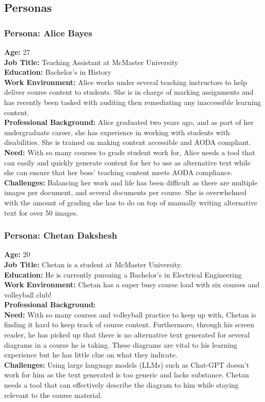 \documentclass[12pt]{article}
\begin{document}
\subsection{Personas}
\subsubsection*{Persona: Alice Bayes}
\textbf{Age:} 27 \\
\textbf{Job Title:} Teaching Assistant at McMaster University\\
\textbf{Education:} Bachelor's in History\\
\textbf{Work Environment:} Alice works under several teaching
instructors to help deliver course content to students. She is in
charge of marking assignments and has recently been tasked with
auditing then remediating any inaccessible learning content. \\
\textbf{Professional Background:} Alice graduated two years ago, and
as part of her undergraduate career, she has experience in working
with students with disabilities. She is trained on making content
accessible and AODA compliant.\\[2mm]
\textbf{Need:} With so many courses to grade student work for, Alice
needs a tool that can easily and quickly generate content for her to
use as alternative text while she can ensure that her boss' teaching
content meets AODA compliance.\\
\textbf{Challenges:} Balancing her work and life has been difficult
as there are multiple images per document, and several documents per
course. She is overwhelmed with the amount of grading she has to do
on top of manually writing alternative text for over 50 images.

\subsubsection*{Persona: Chetan Dakshesh}
\textbf{Age:} 20 \\
\textbf{Job Title:} Chetan is a student at McMaster University.\\
\textbf{Education:} He is currently pursuing a Bachelor's in
Electrical Engineering\\
\textbf{Work Environment:} Chetan has a super busy course load with
six courses and volleyball club!\\
\textbf{Professional Background:} \\[2mm]
\textbf{Need:} With so many courses and volleyball practice to keep
up with, Chetan is finding it hard to keep track of course content.
Furthermore, through his screen reader, he has picked up that there
is no alternative text generated for several diagrams in a course he
is taking. These diagrams are vital to his learning experience but he
has little clue on what they indicate. \\
\textbf{Challenges:} Using large language models (LLMs) such as
Chat-GPT doesn't work for him as the text generated is too generic
and lacks substance. Chetan needs a tool that can effectively
describe the diagram to him while staying relevant to the course material.
\end{document}
